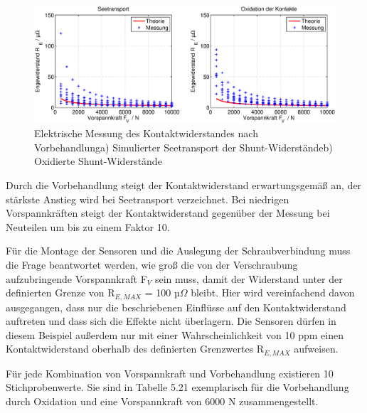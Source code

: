 \noindent 
\begin{figure}[H]
  \centerline{\includegraphics[width=1\textwidth]{Kapitel5/Bilder/image12}}
  \caption{Elektrische Messung des Kontaktwiderstandes nach Vorbehandlunga) Simulierter Seetransport der Shunt-Widerst\"{a}ndeb) Oxidierte Shunt-Widerst\"{a}nde}
  \label{fig:Batteriesensor2}
\end{figure}

\noindent Durch die Vorbehandlung steigt der Kontaktwiderstand erwartungsgem\"{a}{\ss} an, der st\"{a}rkste Anstieg wird bei Seetransport verzeichnet. Bei niedrigen Vorspannkr\"{a}ften steigt der Kontaktwiderstand gegen\"{u}ber der Messung bei Neuteilen um bis zu einem Faktor 10. \newline

\noindent F\"{u}r die Montage der Sensoren und die Auslegung der Schraubverbindung muss die Frage beantwortet werden, wie gro{\ss} die von der Verschraubung aufzubringende Vorspannkraft F$_{V}$ sein muss, damit der Widerstand unter der definierten Grenze von R$_{E,MAX}$ = 100 µ$\Omega$ bleibt. Hier wird vereinfachend davon ausgegangen, dass nur die beschriebenen Einfl\"{u}sse auf den Kontaktwiderstand auftreten und dass sich die Effekte nicht \"{u}berlagern. Die Sensoren d\"{u}rfen in diesem Beispiel au{\ss}erdem nur mit einer Wahrscheinlichkeit von 10 ppm einen Kontaktwiderstand oberhalb des definierten Grenzwertes R$_{E,MAX}$ aufweisen.\newline

\noindent F\"{u}r jede Kombination von Vorspannkraft und Vorbehandlung existieren 10 Stichprobenwerte. Sie sind in Tabelle 5.21 exemplarisch f\"{u}r die Vorbehandlung durch Oxidation und eine Vorspannkraft von 6000 N zusammengestellt.

